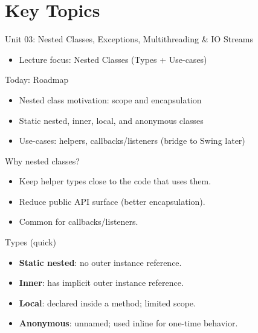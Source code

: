 \documentclass{beamer}
\begin{document}
\section{Key Topics}
\label{sec:concepts}

\begin{frame}{Unit 03: Nested Classes, Exceptions, Multithreading \& IO Streams}
  \begin{itemize}[<+->]
    \item Lecture focus: Nested Classes (Types + Use-cases)
  \end{itemize}
  \slidesources{\OOPSUnitIIISources}
\end{frame}

\begin{frame}{Today: Roadmap}
  \begin{itemize}[<+->]
    \item Nested class motivation: scope and encapsulation
    \item Static nested, inner, local, and anonymous classes
    \item Use-cases: helpers, callbacks/listeners (bridge to Swing later)
  \end{itemize}
  \slidesources{\OOPSUnitIIISources}
\end{frame}

\begin{frame}{Why nested classes?}
  \begin{itemize}[<+->]
    \item Keep helper types close to the code that uses them.
    \item Reduce public API surface (better encapsulation).
    \item Common for callbacks/listeners.
  \end{itemize}
  \slidesources{\OOPSUnitIIISources}
\end{frame}

\begin{frame}{Types (quick)}
  \begin{itemize}[<+->]
    \item \textbf{Static nested}: no outer instance reference.
    \item \textbf{Inner}: has implicit outer instance reference.
    \item \textbf{Local}: declared inside a method; limited scope.
    \item \textbf{Anonymous}: unnamed; used inline for one-time behavior.
  \end{itemize}
  \slidesources{\OOPSUnitIIISources}
\end{frame}
\end{document}
